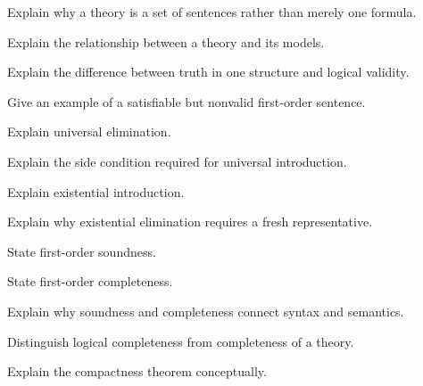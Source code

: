 \begin{exercise}[3]
Explain why a theory is a set of sentences rather than merely one formula.
\end{exercise}

\begin{exercise}[3]
Explain the relationship between a theory and its models.
\end{exercise}

\begin{exercise}[3]
Explain the difference between truth in one structure and logical
validity.
\end{exercise}

\begin{exercise}[3]
Give an example of a satisfiable but nonvalid first-order sentence.
\end{exercise}

\begin{exercise}[3]
Explain universal elimination.
\end{exercise}

\begin{exercise}[3]
Explain the side condition required for universal introduction.
\end{exercise}

\begin{exercise}[3]
Explain existential introduction.
\end{exercise}

\begin{exercise}[3]
Explain why existential elimination requires a fresh representative.
\end{exercise}

\begin{exercise}[3]
State first-order soundness.
\end{exercise}

\begin{exercise}[3]
State first-order completeness.
\end{exercise}

\begin{exercise}[3]
Explain why soundness and completeness connect syntax and semantics.
\end{exercise}

\begin{exercise}[3]
Distinguish logical completeness from completeness of a theory.
\end{exercise}

\begin{exercise}[3]
Explain the compactness theorem conceptually.
\end{exercise}


